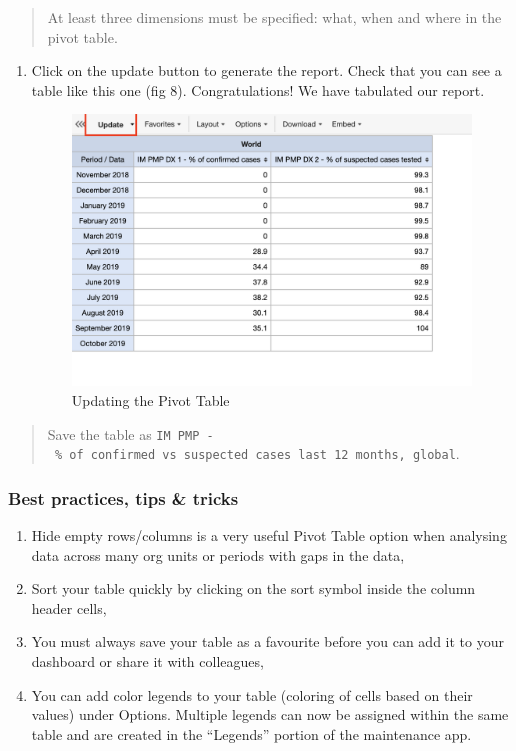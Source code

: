 \documentclass[]{book}
\providecommand{\tightlist}{%
  \setlength{\itemsep}{0pt}\setlength{\parskip}{0pt}}
\begin{document}
\begin{quote}
At least three dimensions must be specified: what, when and where in the pivot table.
\end{quote}

\begin{enumerate}
\def\labelenumi{\arabic{enumi}.}
\setcounter{enumi}{6}
\tightlist
\item
  Click on the update button to generate the report. Check that you can see a table like this one (fig 8). Congratulations! We have tabulated our report.

  \begin{figure}
  \includegraphics[width=16.67in]{./images/pivot-table3} \caption{Updating the Pivot Table}\label{fig:pivot-table3}
  \end{figure}
\end{enumerate}

\begin{quote}
Save the table as \texttt{IM\ PMP\ -\ \%\ of\ confirmed\ vs\ suspected\ cases\ last\ 12\ months,\ global}.
\end{quote}

\hypertarget{best-practices-tips-tricks}{%
\subsubsection{Best practices, tips \& tricks}\label{best-practices-tips-tricks}}

\begin{enumerate}
\def\labelenumi{\arabic{enumi}.}
\tightlist
\item
  Hide empty rows/columns is a very useful Pivot Table option when analysing data across many org units or periods with gaps in the data,
\item
  Sort your table quickly by clicking on the sort symbol inside the column header cells,
\item
  You must always save your table as a favourite before you can add it to your dashboard or share it with colleagues,
\item
  You can add color legends to your table (coloring of cells based on their values) under Options. Multiple legends can now be assigned within the same table and are created in the ``Legends'' portion of the maintenance app.
\end{enumerate}
\end{document}
